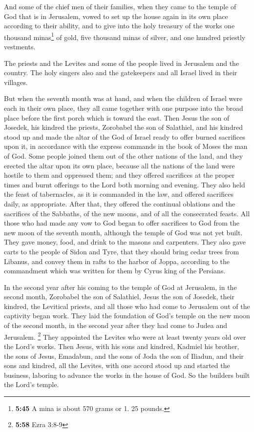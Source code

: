  And some of the chief men of their families, when they
came to the temple of God that is in Jerusalem, vowed to set up the
house again in its own place according to their ability, 
and to give into the holy treasury of the works one thousand
minas\footnote{\textbf{5:45} A mina is about 570 grams or 1. 25 pounds.}
of gold, five thousand minas of silver, and one hundred priestly
vestments.

 The priests and the Levites and some of the people lived
in Jerusalem and the country. The holy singers also and the gatekeepers
and all Israel lived in their villages.

 But when the seventh month was at hand, and when the
children of Israel were each in their own place, they all came together
with one purpose into the broad place before the first porch which is
toward the east.  Then Jesus the son of Josedek, his
kindred the priests, Zorobabel the son of Salathiel, and his kindred
stood up and made the altar of the God of Israel ready 
to offer burned sacrifices upon it, in accordance with the express
commands in the book of Moses the man of God.  Some
people joined them out of the other nations of the land, and they
erected the altar upon its own place, because all the nations of the
land were hostile to them and oppressed them; and they offered
sacrifices at the proper times and burnt offerings to the Lord both
morning and evening.  They also held the feast of
tabernacles, as it is commanded in the law, and offered sacrifices
daily, as appropriate.  After that, they offered the
continual oblations and the sacrifices of the Sabbaths, of the new
moons, and of all the consecrated feasts.  All those who
had made any vow to God began to offer sacrifices to God from the new
moon of the seventh month, although the temple of God was not yet built.
 They gave money, food, and drink to the masons and
carpenters.  They also gave carts to the people of Sidon
and Tyre, that they should bring cedar trees from Libanus, and convey
them in rafts to the harbor of Joppa, according to the commandment which
was written for them by Cyrus king of the Persians.

 In the second year after his coming to the temple of God
at Jerusalem, in the second month, Zorobabel the son of Salathiel, Jesus
the son of Josedek, their kindred, the Levitical priests, and all those
who had come to Jerusalem out of the captivity began work.
 They laid the foundation of God's temple on the new moon
of the second month, in the second year after they had come to Judea and
Jerusalem.  \footnote{\textbf{5:58} Ezra 3:8-9} They
appointed the Levites who were at least twenty years old over the Lord's
works. Then Jesus, with his sons and kindred, Kadmiel his brother, the
sons of Jesus, Emadabun, and the sons of Joda the son of Iliadun, and
their sons and kindred, all the Levites, with one accord stood up and
started the business, laboring to advance the works in the house of God.
So the builders built the Lord's temple.

